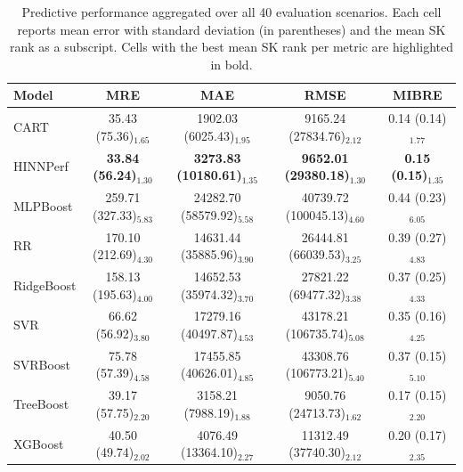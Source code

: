 \begin{table}[htbp]
\centering
\scriptsize
\caption{Predictive performance aggregated over all 40 evaluation scenarios.
Each cell reports mean error with standard deviation (in parentheses) and the mean SK rank as a subscript. Cells with the best mean SK rank per metric are highlighted in bold.}

\label{tab:rq1-overall}
\begin{tabular}{lcccc}
\toprule
Model & MRE & MAE & RMSE & MIBRE \\
\midrule
CART & 35.43 (75.36)$_{1.65}$ & 1902.03 (6025.43)$_{1.95}$ & 9165.24 (27834.76)$_{2.12}$ & 0.14 (0.14)$_{1.77}$ \\
HINNPerf & \textbf{33.84 (56.24)$_{1.30}$} & \textbf{3273.83 (10180.61)$_{1.35}$} & \textbf{9652.01 (29380.18)$_{1.30}$} & \textbf{0.15 (0.15)$_{1.35}$} \\
MLPBoost & 259.71 (327.33)$_{5.83}$ & 24282.70 (58579.92)$_{5.58}$ & 40739.72 (100045.13)$_{4.60}$ & 0.44 (0.23)$_{6.05}$ \\
RR & 170.10 (212.69)$_{4.30}$ & 14631.44 (35885.96)$_{3.90}$ & 26444.81 (66039.53)$_{3.25}$ & 0.39 (0.27)$_{4.83}$ \\
RidgeBoost & 158.13 (195.63)$_{4.00}$ & 14652.53 (35974.32)$_{3.70}$ & 27821.22 (69477.32)$_{3.38}$ & 0.37 (0.25)$_{4.33}$ \\
SVR & 66.62 (56.92)$_{3.80}$ & 17279.16 (40497.87)$_{4.53}$ & 43178.21 (106735.74)$_{5.08}$ & 0.35 (0.16)$_{4.25}$ \\
SVRBoost & 75.78 (57.39)$_{4.58}$ & 17455.85 (40626.01)$_{4.85}$ & 43308.76 (106773.21)$_{5.40}$ & 0.37 (0.15)$_{5.10}$ \\
TreeBoost & 39.17 (57.75)$_{2.20}$ & 3158.21 (7988.19)$_{1.88}$ & 9050.76 (24713.73)$_{1.62}$ & 0.17 (0.15)$_{2.20}$ \\
XGBoost & 40.50 (49.74)$_{2.02}$ & 4076.49 (13364.10)$_{2.27}$ & 11312.49 (37740.30)$_{2.12}$ & 0.20 (0.17)$_{2.35}$ \\
\bottomrule
\end{tabular}
\end{table}
